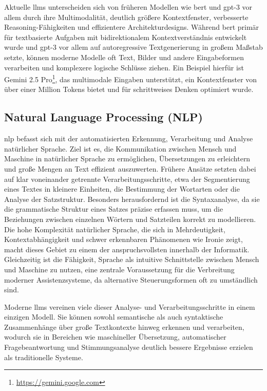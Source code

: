 Aktuelle \glspl{llm} unterscheiden sich von früheren Modellen wie \gls{bert} und \gls{gpt}-3 vor allem durch ihre Multimodalität, deutlich größere Kontextfenster, verbesserte Reasoning-Fähigkeiten und effizientere Architekturdesigns.
Während \gls{bert} primär für textbasierte Aufgaben mit bidirektionalem Kontextverständnis entwickelt wurde und \gls{gpt}-3 vor allem auf autoregressive Textgenerierung in großem Maßstab setzte, können moderne Modelle oft Text, Bilder und andere Eingabeformen verarbeiten und komplexere logische Schlüsse ziehen.
Ein Beispiel hierfür ist Gemini 2.5 Pro\footnote{\url{https://gemini.google.com}}, das multimodale Eingaben unterstützt, ein Kontextfenster von über einer Million Tokens bietet und für schrittweises Denken optimiert wurde.

\subsection{Natural Language Processing (NLP)}

\gls{nlp} befasst sich mit der automatisierten Erkennung, Verarbeitung und Analyse natürlicher Sprache.
Ziel ist es, die Kommunikation zwischen Mensch und Maschine in natürlicher Sprache zu ermöglichen, Übersetzungen zu erleichtern und große Mengen an Text effizient auszuwerten.
Frühere Ansätze setzten dabei auf klar voneinander getrennte Verarbeitungsschritte, etwa der Segmentierung eines Textes in kleinere Einheiten, die Bestimmung der Wortarten oder die Analyse der Satzstruktur.
Besonders herausfordernd ist die Syntaxanalyse, da sie die grammatische Struktur eines Satzes präzise erfassen muss, um die Beziehungen zwischen einzelnen Wörtern und Satzteilen korrekt zu modellieren.
Die hohe Komplexität natürlicher Sprache, die sich in Mehrdeutigkeit, Kontextabhängigkeit und schwer erkennbaren Phänomenen wie Ironie zeigt, macht dieses Gebiet zu einem der anspruchsvollsten innerhalb der Informatik.
Gleichzeitig ist die Fähigkeit, Sprache als intuitive Schnittstelle zwischen Mensch und Maschine zu nutzen, eine zentrale Voraussetzung für die Verbreitung moderner Assistenzsysteme, da alternative Steuerungsformen oft zu umständlich sind\autocite{grigoleit_natural_2019}.

Moderne \glspl{llm} vereinen viele dieser Analyse- und Verarbeitungsschritte in einem einzigen Modell.
Sie können sowohl semantische als auch syntaktische Zusammenhänge über große Textkontexte hinweg erkennen und verarbeiten, wodurch sie in Bereichen wie maschineller Übersetzung, automatischer Fragebeantwortung und Stimmungsanalyse deutlich bessere Ergebnisse erzielen als traditionelle Systeme.

